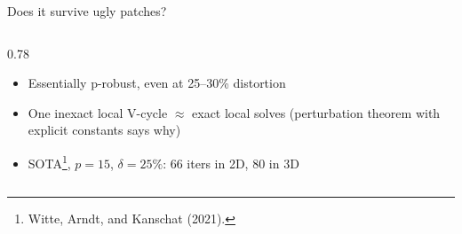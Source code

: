 \documentclass{beamer}
\begin{document}
\begin{frame}{Does it survive ugly patches?}
\begin{columns}[T]
\begin{column}{0.78\textwidth}
\begin{table}
            \end{table}
            \begin{itemize}
                \footnotesize
                \item Essentially \alert{p-robust}, even at 25--30\% distortion
                \item One inexact local V-cycle $\approx$ exact local solves {\small (perturbation theorem with explicit constants says why)}
                \item SOTA\footnote{Witte, Arndt, and Kanschat (2021).}, $p=15$, $\delta=25\%$: \alert{66} iters in 2D, \alert{80} in 3D
            \end{itemize}
        \end{column}
    \end{columns}
\end{frame}
\end{document}

